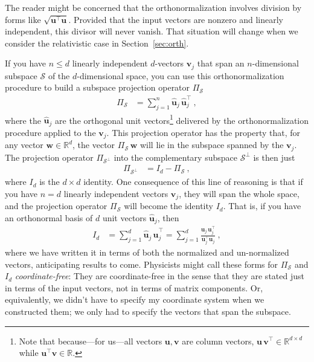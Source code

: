 \documentclass{article}
\newcommand{\proj}{\mathsf{\Pi}}
\newcommand{\Evec}[1]{{\mathbf{#1}}} %
\newcommand{\Ehat}[1]{{\mathbf{\hat{#1}}}} %
\newcommand{\secref}[1]{Section~\ref{#1}}
\begin{document}
The reader might be concerned that the orthonormalization involves division by forms like $\sqrt{\Evec{u}^\top\Evec{u}}$.
Provided that the input vectors are nonzero and linearly independent, this divisor will never vanish.
That situation will change when we consider the relativistic case in \secref{sec:orth}.

If you have $n\leq d$ linearly independent $d$-vectors $\Evec{v}_j$ that span an $n$-dimensional subspace $\mathscr{S}$ of the $d$-dimensional space, you can use this orthonormalization procedure to build a subspace projection operator $\proj_\mathscr{S}$
\begin{align}\label{eq:oproj}
    \proj_\mathscr{S} &= \sum_{j=1}^n \Ehat{u}_j\,\Ehat{u}_j^\top ~,
\end{align}
where the $\Ehat{u}_j$ are the orthogonal unit vectors\footnote{Note that because---for us---all vectors $\Evec{u},\Evec{v}$ are column vectors, $\Evec{u}\,\Evec{v}^\top\in\mathbb{R}^{d\times d}$ while $\Evec{u}^\top \Evec{v}\in\mathbb{R}$.} delivered by the orthonormalization procedure applied to the $\Evec{v}_j$.
This projection operator has the property that, for any vector $\Evec{w}\in\mathbb{R}^d$, the vector $\proj_\mathscr{S}\,\Evec{w}$ will lie in the subspace spanned by the $\Evec{v}_j$.
The projection operator $\proj_{\mathscr{S}^\perp}$ into the complementary subspace $\mathscr{S}^\perp$ is then just
\begin{align}\label{eq:oprojcomp}
    \proj_{\mathscr{S}^\perp} &= I_d - \proj_\mathscr{S} ~,
\end{align}
where $I_d$ is the $d\times d$ identity.
One consequence of this line of reasoning is that if you have $n=d$ linearly independent vectors $\Evec{v}_j$, they will span the whole space, and the projection operator $\proj_\mathscr{S}$ will become the identity $I_d$.
That is, if you have an orthonormal basis of $d$ unit vectors $\Ehat{u}_j$, then
\begin{align}\label{eq:oI}
    I_d &= \sum_{j=1}^d \Ehat{u}_j\,\Ehat{u}_j^\top = \sum_{j=1}^d \frac{\Evec{u}_j\,\Evec{u}_j^\top}{\Evec{u}_j^\top\Evec{u}_j} ~,
\end{align}
where we have written it in terms of both the normalized and un-normalized vectors, anticipating results to come.
Physicists might call these forms for $\proj_\mathscr{S}$ and $I_d$ \emph{coordinate-free}:
They are coordinate-free in the sense that they are stated just in terms of the input vectors, not in terms of matrix components.
Or, equivalently, we didn't have to specify my coordinate system when we constructed them; we only had to specify the vectors that span the subspace.
\end{document}
